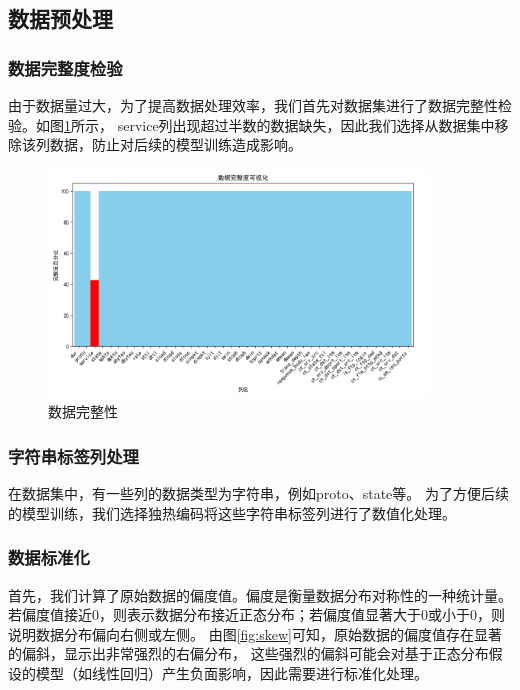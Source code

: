 \documentclass{article}
\begin{document}
\subsection{数据预处理}

\subsubsection{数据完整度检验}
由于数据量过大，为了提高数据处理效率，我们首先对数据集进行了数据完整性检验。如图\ref{fig:full}所示，
service列出现超过半数的数据缺失，因此我们选择从数据集中移除该列数据，防止对后续的模型训练造成影响。
\begin{figure}[htpb]
  \centering
  \includegraphics[width=0.9\textwidth]{./png/full.png}
  \caption{数据完整性}
  \label{fig:full}
\end{figure}
\subsubsection{字符串标签列处理}
在数据集中，有一些列的数据类型为字符串，例如proto、state等。
为了方便后续的模型训练，我们选择独热编码将这些字符串标签列进行了数值化处理。
\subsubsection{数据标准化}

首先，我们计算了原始数据的偏度值。偏度是衡量数据分布对称性的一种统计量。
若偏度值接近0，则表示数据分布接近正态分布；若偏度值显著大于0或小于0，则说明数据分布偏向右侧或左侧。
由图\ref{fig:skew}可知，原始数据的偏度值存在显著的偏斜，显示出非常强烈的右偏分布，
这些强烈的偏斜可能会对基于正态分布假设的模型（如线性回归）产生负面影响，因此需要进行标准化处理。
\end{document}
